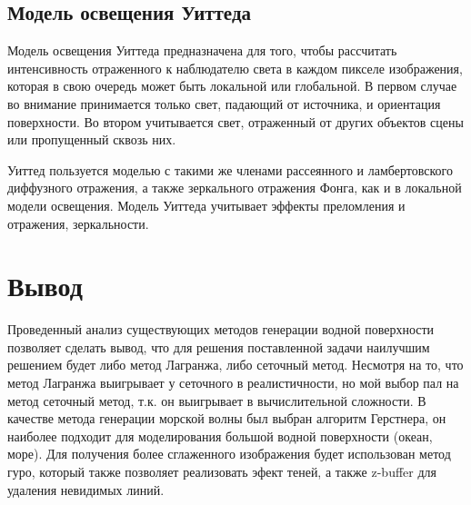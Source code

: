 \subsection{Модель освещения Уиттеда}
Модель освещения Уиттеда предназначена для того, чтобы рассчитать интенсивность отраженного к наблюдателю света в каждом пикселе изображения, которая в свою очередь может быть локальной или глобальной. В первом случае во внимание принимается только свет, падающий от источника, и ориентация поверхности. Во втором учитывается свет, отраженный от других объектов сцены или пропущенный сквозь них.
 
Уиттед пользуется моделью с такими же членами рассеянного и ламбертовского диффузного отражения, а также зеркального отражения Фонга, как и в локальной модели освещения. Модель Уиттеда учитывает эффекты преломления и отражения, зеркальности.

\newpage
\section*{Вывод}
Проведенный анализ существующих методов генерации водной поверхности позволяет сделать вывод, что для решения поставленной задачи наилучшим решением будет либо метод Лагранжа, либо сеточный метод. Несмотря на то, что метод Лагранжа выигрывает у сеточного в реалистичности, но мой выбор пал на метод сеточный метод, т.к. он выигрывает в вычислительной сложности.
В качестве метода генерации морской волны был выбран алгоритм Герстнера, он наиболее подходит для моделирования большой водной поверхности (океан, море). Для получения более сглаженного изображения будет использован метод гуро, который также позволяет реализовать эфект теней,  а также z-buffer для удаления невидимых линий.

